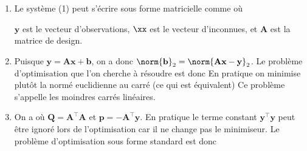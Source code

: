 \documentclass{article}
\begin{document}
\begin{enumerate}
	\item Le système (1) peut s'écrire sous forme matricielle comme
	où
	
	$\mathbf{y}$ est le vecteur d'observations, $\xx$ est le vecteur d'inconnues, et $\mathbf{A}$ est la matrice de design.
	
	\item Puisque $\mathbf{y} = \mathbf{A}\mathbf{x}+\mathbf{b}$, on a donc $\norm{\mathbf{b}}_2 = \norm{\mathbf{A}\mathbf{x} - \mathbf{y}}_2$. Le problème d'optimisation que l'on cherche à résoudre est donc
	En pratique on minimise plutôt la normé euclidienne au carré (ce qui est équivalent)
	Ce problème s'appelle les moindres carrés linéaires.
	
	\item On a 
	où $\mathbf{Q} = \mathbf{A}^\top\mathbf{A}$ et $\mathbf{p} = -\mathbf{A}^\top \mathbf{y}$. En pratique le terme constant $\mathbf{y}^\top \mathbf{y}$ peut être ignoré lors de l'optimisation car il ne change pas le minimiseur. Le problème d'optimisation sous forme standard est donc
	

\end{enumerate}
\end{document}
